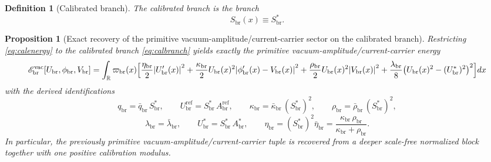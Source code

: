 \documentclass[11pt]{article}
\newcommand{\ProfWeight}{\varpi_{\mathrm{br}}}
\newcommand{\RespVacAmp}{U_{\mathrm{br}}}
\newcommand{\RespVacRef}{U_{\mathrm{br}}^{\mathrm{ref}}}
\newcommand{\RespVacEq}{U_{\mathrm{br}}^{\ast}}
\newcommand{\RespVacPhase}{\phi_{\mathrm{br}}}
\newcommand{\RespVacCarrier}{V_{\mathrm{br}}}
\newcommand{\RespVacReadout}{q_{\mathrm{br}}}
\newcommand{\RespVacCov}{\kappa_{\mathrm{br}}}
\newcommand{\RespVacRelax}{\rho_{\mathrm{br}}}
\newcommand{\RespVacWell}{\lambda_{\mathrm{br}}}
\newcommand{\RespVacIso}{\eta_{\mathrm{br}}}
\newcommand{\RespVacEnergy}{\mathscr E_{\mathrm{br}}^{\mathrm{vac}}}
\newcommand{\RespScaleField}{S_{\mathrm{br}}}
\newcommand{\RespScaleEq}{S_{\mathrm{br}}^{\ast}}
\newcommand{\RespScaleAmpRef}{A_{\mathrm{br}}^{\mathrm{ref}}}
\newcommand{\RespScaleAmpEq}{A_{\mathrm{br}}^{\ast}}
\newcommand{\RespScaleReadout}{\bar q_{\mathrm{br}}}
\newcommand{\RespScaleCov}{\bar\kappa_{\mathrm{br}}}
\newcommand{\RespScaleRelax}{\bar\rho_{\mathrm{br}}}
\newcommand{\RespScaleWell}{\bar\lambda_{\mathrm{br}}}
\newcommand{\RespScaleIso}{\bar\eta_{\mathrm{br}}}
\newtheorem{definition}{Definition}
\newtheorem{proposition}{Proposition}
\begin{document}
\begin{definition}[Calibrated branch]
\label{def:calbranch}
The \emph{calibrated branch} is the branch
\begin{equation}
\RespScaleField(x)\equiv \RespScaleEq.
\label{eq:calbranch}
\end{equation}
\end{definition}

\begin{proposition}[Exact recovery of the primitive vacuum-amplitude/current-carrier sector on the calibrated branch]
\label{prop:vacrecovery}
Restricting \eqref{eq:calenergy} to the calibrated branch \eqref{eq:calbranch} yields exactly the primitive vacuum-amplitude/current-carrier energy
\begin{equation}
\RespVacEnergy[\RespVacAmp,\RespVacPhase,\RespVacCarrier]
=
\int_{\mathbb R}\ProfWeight(x)\Bigl[
\frac{\RespVacIso}{2}\abs{\RespVacAmp'(x)}^2
+
\frac{\RespVacCov}{2}\RespVacAmp(x)^2\abs{\RespVacPhase'(x)-\RespVacCarrier(x)}^2
+
\frac{\RespVacRelax}{2}\RespVacAmp(x)^2\abs{\RespVacCarrier(x)}^2
+
\frac{\RespVacWell}{8}\bigl(\RespVacAmp(x)^2-(\RespVacEq)^2\bigr)^2
\Bigr]dx
\label{eq:vacenergyrecovered}
\end{equation}
with the derived identifications
\begin{equation}
\RespVacReadout=\RespScaleReadout\,\RespScaleEq,
\qquad
\RespVacRef=\RespScaleEq\,\RespScaleAmpRef,
\qquad
\RespVacCov=\RespScaleCov\,(\RespScaleEq)^2,
\qquad
\RespVacRelax=\RespScaleRelax\,(\RespScaleEq)^2,
\label{eq:vacconstantsfromcalA}
\end{equation}
\begin{equation}
\RespVacWell=\RespScaleWell,
\qquad
\RespVacEq=\RespScaleEq\,\RespScaleAmpEq,
\qquad
\RespVacIso=(\RespScaleEq)^2\RespScaleIso
=
\frac{\RespVacCov\,\RespVacRelax}{\RespVacCov+\RespVacRelax}.
\label{eq:vacconstantsfromcalB}
\end{equation}
In particular, the previously primitive vacuum-amplitude/current-carrier tuple is recovered from a deeper scale-free normalized block together with one positive calibration modulus.
\end{proposition}
\end{document}

